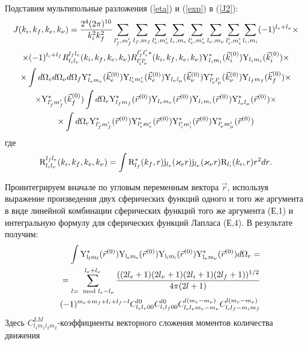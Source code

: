 Подставим мультипольные разложения (\ref{eta}) и (\ref{exp}) в (\ref{J2}):
\begin{multline}\label{bigeq}
J(k_i,k_f,k_e,k_\nu)={2^4 (2\pi)^{10} \over k_i^2 k_f^2}
\sum_{l_f',m_f'}\sum_{l_f,m_f}\sum_{l_e',m_e'}\sum_{l_e,m_e}
\sum_{l_\nu',m_\nu'}\sum_{l_\nu,m_\nu}
\sum_{l_i',m_i'}\sum_{l_i,m_i}
(-1)^{l_e+l_\nu}\times\\
%
\times(-1)^{l_i+l_f}
R^{l_fl_e}_{l_il_\nu}(k_i,k_f,k_e,k_\nu)
R^{l_f'l_e'*}_{l_i'l_\nu'}(k_i,k_f,k_e,k_\nu)
{\rm Y}^*_{l_im_i}(\vec k_i^{(0)}){\rm Y}_{l_im_i}(\vec k_i^{(0)})\times\\
%
\times\int d \Omega_e d\Omega_\nu d\Omega_f
{\rm Y}^*_{l_em_e}(\vec k_e^{(0)}) {\rm Y}_{l_e'm_e'}(\vec k_e^{(0)})
{\rm Y}_{l_\nu l_\mu}(\vec k_\nu^{(0)}){\rm Y}_{l_\nu' l_\mu'}^*(\vec k_\nu^{(0)})
{\rm Y}_{l_fm_f}(\vec k_f^{(0)})\times\\
%
\times{\rm Y}_{l_f'm_f'}^*(\vec k_f^{(0)})
\int d\Omega_r {\rm Y}_{l_fm_f}^*(\vec r^{(0)}){\rm Y}_{l_em_e}(\vec r^{(0)})
{\rm Y}_{l_im_i}(\vec r^{(0)}){\rm Y}^*_{l_\nu l_\mu}(\vec r^{(0)})\times\\
\times\int d\Omega_r {\rm Y}_{l_f'm_f'}^*(\vec r^{(0)}){\rm Y}^*_{l_e'm_e'}(\vec r^{(0)})
{\rm Y}_{l_i'm_i'}^*(\vec r^{(0)}){\rm Y}_{l_\nu' m_\mu'}^*(\vec r^{(0)})
\end{multline}
где
\begin{eqnarray}\label{R}
{\rm R}^{l_f l_e}_{l_i l_\nu}(k_i, k_f, k_e, k_\nu)=
\int{ {\rm R}^*_{l_f}(k_f,r) {\rm j}_{l_e}(\varkappa_e r){\rm j}_{l_\nu}
(\varkappa_\nu r)
{\rm R}_{l_i}(k_i,r) r^2 dr}.
\end{eqnarray}

Проинтегрируем вначале по угловым переменным вектора $\vec r$, используя   выражение произведения двух сферических
функций одного и того же аргумента в виде линейной комбинации сферических функций того же аргумента (Е,1) \cite{davydov}
и интегральную формулу для сферических функций Лапласа (Е,4)\cite{davydov}. В результате получим:
\begin{eqnarray}\label{yyyy}
&&\int{{\rm Y^*_{l_f m_f}}(\vec r^{(0)})
{\rm Y_{l_e m_e}}(\vec r^{(0)}){\rm Y_{l_i m_i}}(\vec r^{(0)})
{\rm Y^*_{l_\nu m_\nu}}(\vec r^{(0)}) d\Omega_r}=\nonumber\\
&&=\sum^{l_e+l_\nu}_{l=\mod{l_e-l_\nu}}{{((2l_e+1)(2l_\nu+1)(2l_i+1)
(2l_f+1))^{1/2}}
\over{4\pi(2l+1)}}\nonumber\\
&&(-1)^{m_e+m_f+l_i+l_f-l}
C_{l_e l_\nu 0 0 }^{l 0} C_{l_i l_f 0 0 }^{ l 0 }
C_{l_e l_\nu m_e -m_\nu}^{ l (m_e-m_\nu)}
C_{l_i l_f -m_i m_f}^{l (m_e - m_\nu)}
\end{eqnarray}
Здесь $C^{LM}_{l_1m_1l_2m_2}$-коэффициенты векторного сложения
моментов количества движения


